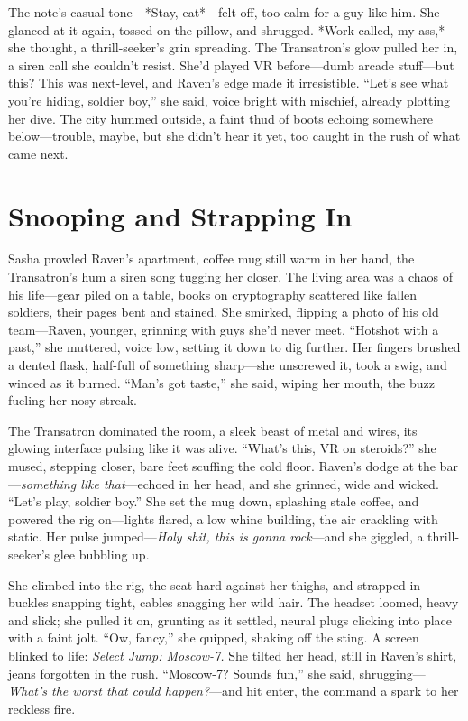 \documentclass[12pt]{book}
\begin{document}
The note’s casual tone—*Stay, eat*—felt off, too calm for a guy like him. She glanced at it again, tossed on the pillow, and shrugged. *Work called, my ass,* she thought, a thrill-seeker’s grin spreading. The Transatron’s glow pulled her in, a siren call she couldn’t resist. She’d played VR before—dumb arcade stuff—but this? This was next-level, and Raven’s edge made it irresistible. “Let’s see what you’re hiding, soldier boy,” she said, voice bright with mischief, already plotting her dive. The city hummed outside, a faint thud of boots echoing somewhere below—trouble, maybe, but she didn’t hear it yet, too caught in the rush of what came next.

\section{Snooping and Strapping In}

Sasha prowled Raven’s apartment, coffee mug still warm in her hand, the Transatron’s hum a siren song tugging her closer. The living area was a chaos of his life—gear piled on a table, books on cryptography scattered like fallen soldiers, their pages bent and stained. She smirked, flipping a photo of his old team—Raven, younger, grinning with guys she’d never meet. “Hotshot with a past,” she muttered, voice low, setting it down to dig further. Her fingers brushed a dented flask, half-full of something sharp—she unscrewed it, took a swig, and winced as it burned. “Man’s got taste,” she said, wiping her mouth, the buzz fueling her nosy streak.

The Transatron dominated the room, a sleek beast of metal and wires, its glowing interface pulsing like it was alive. “What’s this, VR on steroids?” she mused, stepping closer, bare feet scuffing the cold floor. Raven’s dodge at the bar—\textit{something like that}—echoed in her head, and she grinned, wide and wicked. “Let’s play, soldier boy.” She set the mug down, splashing stale coffee, and powered the rig on—lights flared, a low whine building, the air crackling with static. Her pulse jumped—\textit{Holy shit, this is gonna rock}—and she giggled, a thrill-seeker’s glee bubbling up.

She climbed into the rig, the seat hard against her thighs, and strapped in—buckles snapping tight, cables snagging her wild hair. The headset loomed, heavy and slick; she pulled it on, grunting as it settled, neural plugs clicking into place with a faint jolt. “Ow, fancy,” she quipped, shaking off the sting. A screen blinked to life: \textit{Select Jump: Moscow-7.} She tilted her head, still in Raven’s shirt, jeans forgotten in the rush. “Moscow-7? Sounds fun,” she said, shrugging—\textit{What’s the worst that could happen?}—and hit enter, the command a spark to her reckless fire.
\end{document}
